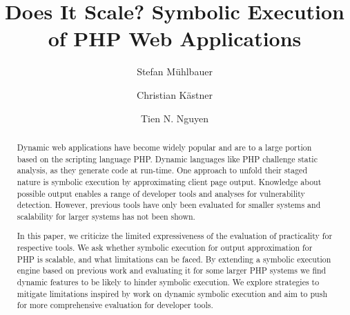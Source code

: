 \documentclass[sigconf]{acmart}
\begin{document}
\title{Does It Scale? Symbolic Execution of PHP Web Applications}


\author{Stefan Mühlbauer}

\author{Christian Kästner}

\author{Tien N. Nguyen}


\renewcommand{\shortauthors}{
}


\begin{abstract}
Dynamic web applications have become widely popular and are to a large portion
based on the scripting language PHP. Dynamic languages like PHP challenge
static analysis, as they generate code at run-time. One approach to unfold their
staged nature is symbolic execution by approximating client page output.
Knowledge about possible output enables a range of developer tools and analyses
for vulnerability detection. However, previous tools have only been evaluated
for smaller systems and scalability for larger systems has not been shown.
 
In this paper, we criticize the limited expressiveness of the evaluation of
practicality for respective tools. We ask whether symbolic execution for output
approximation for PHP is scalable, and what limitations can be faced. By
extending a symbolic execution engine based on previous work and evaluating it
for some larger PHP systems we find dynamic features to be likely to hinder
symbolic execution. We explore strategies to mitigate limitations inspired by
work on dynamic symbolic execution and aim to push for more comprehensive
evaluation for developer tools.
\end{abstract}
\end{document}
